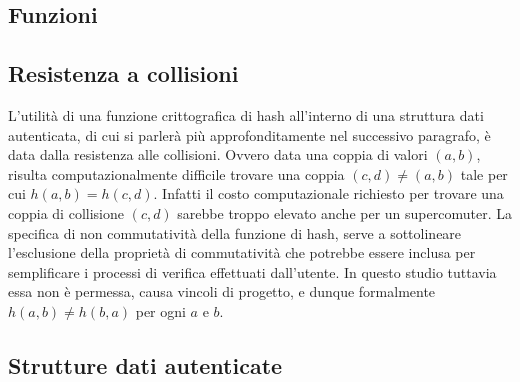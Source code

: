 		\subsection{Funzioni}
	

	\subsection{Resistenza a collisioni}
	

		L'utilità di una funzione crittografica di hash all'interno di una struttura dati autenticata, di cui si parlerà più approfonditamente nel successivo paragrafo, è data dalla resistenza alle collisioni. Ovvero data una coppia di valori $ (a,b) $, risulta computazionalmente difficile trovare una coppia $ (c,d) \ne (a,b) $ tale per cui  $ h(a,b) = h(c,d) $. Infatti il costo computazionale richiesto per trovare una coppia di collisione $ (c,d) $ sarebbe troppo elevato anche per un supercomuter.
		La specifica di non commutatività della funzione di hash, serve a sottolineare l'esclusione della proprietà di commutatività che potrebbe essere inclusa per semplificare i processi di verifica effettuati dall'utente.
		In questo studio tuttavia essa non è permessa, causa vincoli di progetto, e dunque formalmente $ h(a,b) \ne h(b,a) $ per ogni $ a $ e $ b $.

	\subsection{Strutture dati autenticate}


